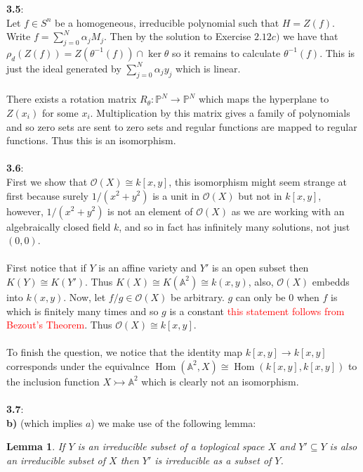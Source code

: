 \documentclass[12pt]{article}
\numberwithin{thm}{subsection}
\numberwithin{defn}{subsection}
\newtheorem{lemma}{Lemma}
\numberwithin{lemma}{subsection}
\numberwithin{example}{subsection}
\numberwithin{notation}{subsection}
\numberwithin{cor}{subsection}
\numberwithin{remark}{subsection}
\numberwithin{condition}{subsection}
\numberwithin{question}{subsection}
\numberwithin{construction}{subsection}
\numberwithin{construction}{subsection}
\numberwithin{construction}{subsection}
\newcommand{\bb}[1]{\mathbb{#1}}
\newcommand{\call}[1]{\mathcal{#1}}
\newcommand{\lto}{\longrightarrow}
\begin{document}
%
\textbf{3.5}:\\
Let $f \in S^n$ be a homogeneous, irreducible polynomial such that $H = Z(f)$. Write $f = \sum_{j = 0}^{N}\alpha_j M_j$. Then by the solution to Exercise $2.12c)$ we have that $\rho_d(Z(f)) = Z(\theta^{-1}(f)) \cap \ker \theta$ so it remains to calculate $\theta^{-1}(f)$. This is just the ideal generated by $\sum_{j = 0}^N \alpha_j y_j$ which is linear.\\\\
%
There exists a rotation matrix $R_\theta: \bb{P}^N \lto \bb{P}^N$ which maps the hyperplane to $Z(x_i)$ for some $x_i$. Multiplication by this matrix gives a family of polynomials and so zero sets are sent to zero sets and regular functions are mapped to regular functions. Thus this is an isomorphism.\\\\
%
\textbf{3.6}:\\
First we show that $\call{O}(X) \cong k[x,y]$, this isomorphism might seem strange at first because surely $1/(x^2+y^2)$ is a unit in $\call{O}(X)$ but not in $k[x,y]$, however, $1/(x^2 + y^2)$ is not an element of $\call{O}(X)$ as we are working with an algebraically closed field $k$, and so in fact has infinitely many solutions, not just $(0,0)$.\\\\
%
First notice that if $Y$ is an affine variety and $Y'$ is an open subset then $K(Y) \cong K(Y')$. Thus $K(X) \cong K(\bb{A}^2) \cong k(x,y)$, also, $\call{O}(X)$ embedds into $k(x,y)$. Now, let $f/g \in \call{O}(X)$ be arbitrary. $g$ can only be $0$ when $f$ is which is finitely many times and so $g$ is a constant \textcolor{red}{this statement follows from Bezout's Theorem}. Thus $\call{O}(X) \cong k[x,y]$.\\\\
%
To finish the question, we notice that the identity map $k[x,y] \lto k[x,y]$ corresponds under the equivalnce $\operatorname{Hom}(\bb{A}^2,X) \cong \operatorname{Hom}(k[x,y],k[x,y])$ to the inclusion function $X \rightarrowtail \bb{A}^2$ which is clearly not an isomorphism.\\\\
%
\textbf{3.7}:\\
\textbf{b)} (which implies $a$) we make use of the following lemma:
\begin{lemma}
\label{lem:another_irred}
If $Y$ is an irreducible subset of a toplogical space $X$ and $Y' \subseteq Y$ is also an irreducible subset of $X$ then $Y'$ is irreducible as a subset of $Y$.
\end{lemma}
\end{document}
